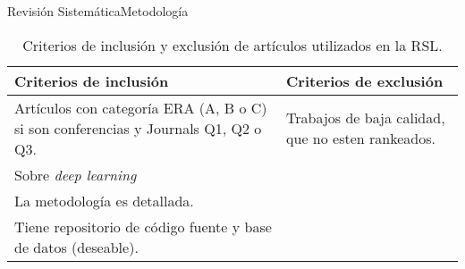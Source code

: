 \documentclass[10pt]{beamer}
\newcommand{\1}{
	\setbeamertemplate{background}{
		\texttt{[image: img/1]}
		\tikz[overlay] \fill[fill opacity=0.75,fill=white] (0,0) rectangle (-\paperwidth,\paperheight);
	}
}
\begin{document}
\begin{frame}{Revisión Sistemática}{Metodología}
	
	\begin{table}[H]
		\begin{center}
			\caption{Criterios de inclusión y exclusión de artículos utilizados en la RSL.}
			\label{tab:criterios}
			\setlength{\tabcolsep}{0.5em} %
			{\renewcommand{\arraystretch}{1.2}%
				\begin{tabular}{p{5cm}p{5cm}}
					\textbf{Criterios de inclusión}                                                   & \textbf{Criterios de exclusión}                                                           \\ \hline
					Artículos con categoría ERA (A, B o C) si son conferencias y Journals Q1, Q2 o Q3. & Trabajos de baja calidad, que no esten rankeados.                                      \\
					Sobre \textit{deep learning}                \\
					La metodología es detallada.                                                                                                               &                                                                                                        \\
					Tiene repositorio de código fuente y base de datos (deseable).                                          &                                                                                                        \\
					
				\end{tabular}
			}
		\end{center}
	\end{table}
	
\end{frame}
\end{document}
